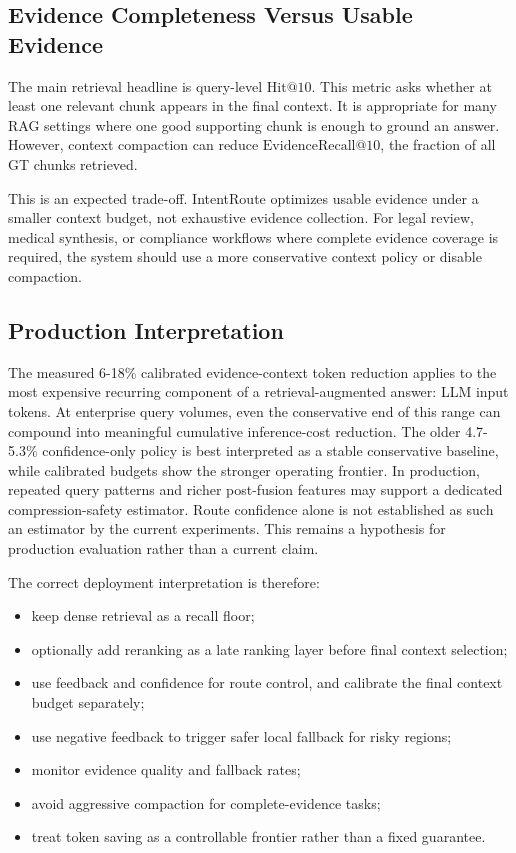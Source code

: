 \subsection{Evidence Completeness Versus Usable Evidence}
\label{sec:07-discussion:evidence-completeness-versus-usable-evidence}

The main retrieval headline is query-level $\mathrm{Hit@10}$. This metric asks whether at least one relevant chunk appears in the final context. It is appropriate for many RAG settings where one good supporting chunk is enough to ground an answer. However, context compaction can reduce $\mathrm{EvidenceRecall@10}$, the fraction of all GT chunks retrieved.

This is an expected trade-off. IntentRoute optimizes usable evidence under a smaller context budget, not exhaustive evidence collection. For legal review, medical synthesis, or compliance workflows where complete evidence coverage is required, the system should use a more conservative context policy or disable compaction.

\subsection{Production Interpretation}
\label{sec:07-discussion:production-interpretation}

The measured 6-18\% calibrated evidence-context token reduction applies to the most expensive recurring component of a retrieval-augmented answer: LLM input tokens. At enterprise query volumes, even the conservative end of this range can compound into meaningful cumulative inference-cost reduction. The older 4.7-5.3\% confidence-only policy is best interpreted as a stable conservative baseline, while calibrated budgets show the stronger operating frontier. In production, repeated query patterns and richer post-fusion features may support a dedicated compression-safety estimator. Route confidence alone is not established as such an estimator by the current experiments. This remains a hypothesis for production evaluation rather than a current claim.

The correct deployment interpretation is therefore:

\begin{itemize}
\item keep dense retrieval as a recall floor;
\item optionally add reranking as a late ranking layer before final context selection;
\item use feedback and confidence for route control, and calibrate the final context budget separately;
\item use negative feedback to trigger safer local fallback for risky regions;
\item monitor evidence quality and fallback rates;
\item avoid aggressive compaction for complete-evidence tasks;
\item treat token saving as a controllable frontier rather than a fixed guarantee.
\end{itemize}
